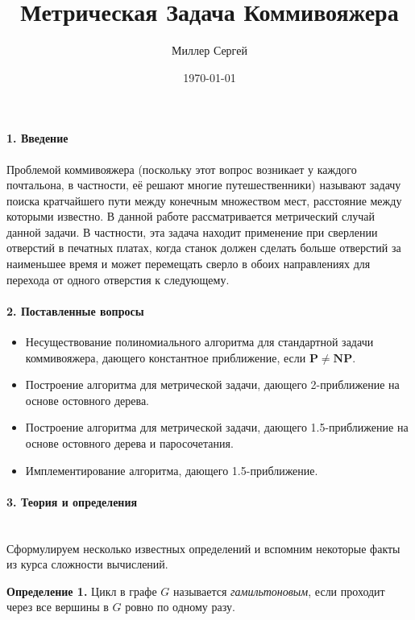 \documentclass[14pt]{article}
\title{
\textbf{Метрическая Задача Коммивояжера} 
}
\date{\today}
\author{Миллер Сергей}
\begin{document}
    \maketitle
    \paragraph{\large{1. Введение}}
    \begin{flushleft}
   Проблемой коммивояжера (поскольку этот вопрос возникает у каждого почтальона, в частности, её решают многие путешественники) называют задачу поиска кратчайшего пути между конечным множеством мест, расстояние между которыми известно. 
   В данной работе рассматривается метрический случай данной задачи.
    В частности, эта задача  находит применение при сверлении отверстий в печатных платах, когда станок должен сделать больше отверстий за наименьшее время и может перемещать сверло в обоих направлениях для перехода от одного отверстия к следующему.
    \end{flushleft}  
    
    \paragraph{\large{2. Поставленные вопросы}}
    \begin{itemize}
    \item  Несуществование полиномиального алгоритма для стандартной задачи коммивояжера, дающего константное приближение, если $\mathbf{P} \neq \mathbf{NP}$.
    \item Построение алгоритма для метрической задачи, дающего 2-приближение на основе остовного дерева.
    \item Построение алгоритма для метрической задачи, дающего 1.5-приближение на основе остовного дерева и паросочетания.
    \item Имплементирование алгоритма, дающего 1.5-приближение.
    \end{itemize}

    \paragraph{\large{3. Теория и определения}}\mbox{}\\

    Сформулируем несколько известных определений и вспомним некоторые факты из курса сложности вычислений.

    \textbf{Определение 1.} Цикл в графе $G$ называется \textit{гамильтоновым}, если проходит через все вершины в $G$ ровно по одному разу.
\end{document}
